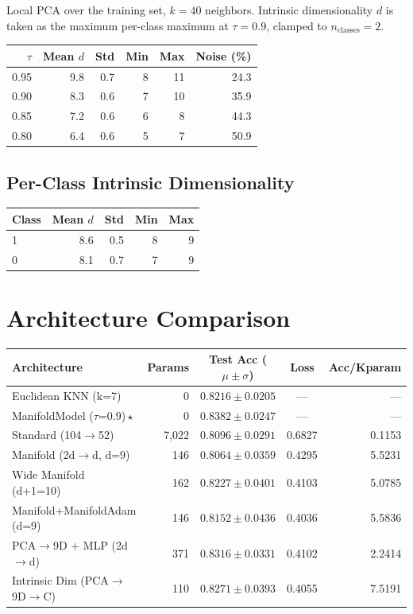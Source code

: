 \documentclass[11pt,letterpaper]{article}
\begin{document}
Local PCA over the training set, $k = 40$ neighbors. Intrinsic dimensionality $d$ is taken as the maximum per-class maximum at $\tau = 0.9$, clamped to $n_{\mathrm{classes}} = 2$.

\begin{tabular}{@{}rrrrrr@{}}
\toprule
$\tau$ & Mean $d$ & Std & Min & Max & Noise (\%) \\
\midrule
  0.95 & 9.8 & 0.7 & 8 & 11 & 24.3 \\
  0.90 & 8.3 & 0.6 & 7 & 10 & 35.9 \\
  0.85 & 7.2 & 0.6 & 6 & 8 & 44.3 \\
  0.80 & 6.4 & 0.6 & 5 & 7 & 50.9 \\
\bottomrule
\end{tabular}

\subsection{Per-Class Intrinsic Dimensionality}

\begin{tabular}{@{}lrrrr@{}}
\toprule
Class & Mean $d$ & Std & Min & Max \\
\midrule
  1 & 8.6 & 0.5 & 8 & 9 \\
  0 & 8.1 & 0.7 & 7 & 9 \\
\bottomrule
\end{tabular}

\section{Architecture Comparison}

{\small
\begin{tabular}{@{}p{7cm}rccr@{}}
\toprule
\textbf{Architecture} & \textbf{Params} & \textbf{Test Acc ($\mu \pm \sigma$)} & \textbf{Loss} & \textbf{Acc/Kparam} \\
\midrule
  {Euclidean KNN (k=7)} & 0 & $0.8216 \pm 0.0205$ & --- & --- \\
  {\color{wincolor}ManifoldModel ($\tau$=0.9)\,$\star$} & 0 & $0.8382 \pm 0.0247$ & --- & --- \\
  {Standard (104$\rightarrow$52)} & 7,022 & $0.8096 \pm 0.0291$ & 0.6827 & 0.1153 \\
  {Manifold (2d$\rightarrow$d, d=9)} & 146 & $0.8064 \pm 0.0359$ & 0.4295 & 5.5231 \\
  {Wide Manifold (d+1=10)} & 162 & $0.8227 \pm 0.0401$ & 0.4103 & 5.0785 \\
  {Manifold+ManifoldAdam (d=9)} & 146 & $0.8152 \pm 0.0436$ & 0.4036 & 5.5836 \\
  {PCA$\rightarrow$9D + MLP (2d$\rightarrow$d)} & 371 & $0.8316 \pm 0.0331$ & 0.4102 & 2.2414 \\
  {Intrinsic Dim (PCA$\rightarrow$9D$\rightarrow$C)} & 110 & $0.8271 \pm 0.0393$ & 0.4055 & 7.5191 \\
\bottomrule
\end{tabular}
}
\end{document}
